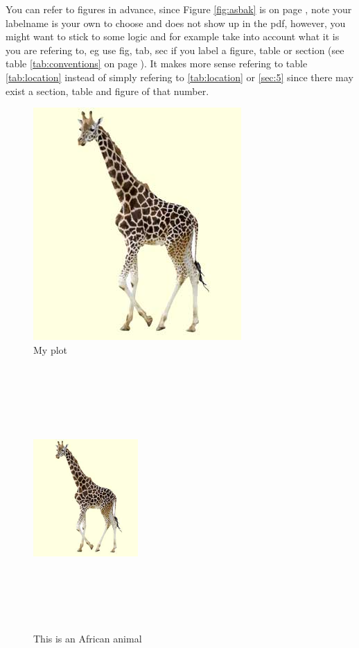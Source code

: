 \documentclass[thesis]{subfiles}
\begin{document}
You can refer to figures in advance, since Figure \ref{fig:asbak} is on page \pageref{fig:asbak}, note your labelname is your own to choose and does not show up in the pdf, however, you might want to stick to some logic and for example take into account what it is you are refering to, eg use fig, tab, sec if you label a figure, table or section (see table \ref{tab:conventions} on page \pageref{tab:conventions}). It makes more sense refering to table \ref{tab:location} instead of simply refering to \ref{tab:location} or \ref{sec:5} since there may exist a section, table and figure of that number.

\begin{figure}[htbp] 
	\includegraphics[width=0.9\linewidth]{Giraffe_klein.jpg}
	\caption{My plot}
	\label{fig:myPlot}
\end{figure}

\begin{figure}[h!]
    \includegraphics[height = 10cm, width = 4cm]{Giraffe_klein.jpg}
    \caption{This is an African animal}
    \label{fig:Lang}
\end{figure}
\end{document}
